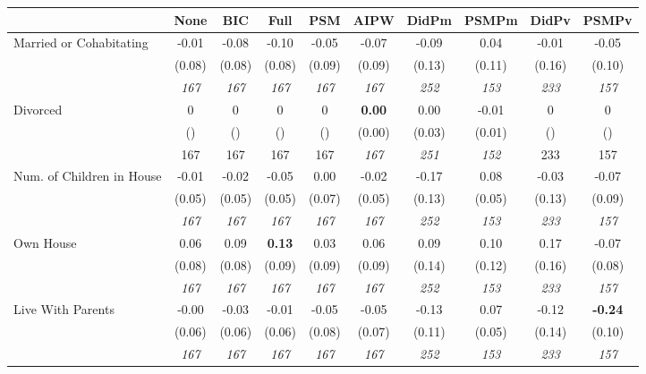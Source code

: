 \begin{tabular}{l c c c c c c c c c}
\toprule
 & None & BIC & Full & PSM & AIPW & DidPm & PSMPm & DidPv & PSMPv \\
\midrule
Married or Cohabitating & -0.01 & -0.08 & -0.10 & -0.05 & -0.07 & -0.09 & 0.04 & -0.01 & -0.05 \\
& (0.08) & (0.08) & (0.08) & (0.09) & (0.09) & (0.13) & (0.11) & (0.16) & (0.10) \\
& \textit{ 167 } & \textit{ 167 } & \textit{ 167 } & \textit{ 167 } & \textit{ 167 } & \textit{ 252 } & \textit{ 153 } & \textit{ 233 } & \textit{ 157 } \\
Divorced & 0 & 0 & 0 & 0 & \textbf{0.00} & 0.00 & -0.01 & 0 & 0 \\
& () & () & () & () & (0.00) & (0.03) & (0.01) & () & () \\
& 167 & 167 & 167 & 167 & \textit{ 167 } & \textit{ 251 } & \textit{ 152 } & 233 & 157 \\
Num. of Children in House & -0.01 & -0.02 & -0.05 & 0.00 & -0.02 & -0.17 & 0.08 & -0.03 & -0.07 \\
& (0.05) & (0.05) & (0.05) & (0.07) & (0.05) & (0.13) & (0.05) & (0.13) & (0.09) \\
& \textit{ 167 } & \textit{ 167 } & \textit{ 167 } & \textit{ 167 } & \textit{ 167 } & \textit{ 252 } & \textit{ 153 } & \textit{ 233 } & \textit{ 157 } \\
Own House & 0.06 & 0.09 & \textbf{ 0.13 } & 0.03 & 0.06 & 0.09 & 0.10 & 0.17 & -0.07 \\
& (0.08) & (0.08) & (0.09) & (0.09) & (0.09) & (0.14) & (0.12) & (0.16) & (0.08) \\
& \textit{ 167 } & \textit{ 167 } & \textit{ 167 } & \textit{ 167 } & \textit{ 167 } & \textit{ 252 } & \textit{ 153 } & \textit{ 233 } & \textit{ 157 } \\
Live With Parents & -0.00 & -0.03 & -0.01 & -0.05 & -0.05 & -0.13 & 0.07 & -0.12 & \textbf{-0.24} \\
& (0.06) & (0.06) & (0.06) & (0.08) & (0.07) & (0.11) & (0.05) & (0.14) & (0.10) \\
& \textit{ 167 } & \textit{ 167 } & \textit{ 167 } & \textit{ 167 } & \textit{ 167 } & \textit{ 252 } & \textit{ 153 } & \textit{ 233 } & \textit{ 157 } \\
\bottomrule
\end{tabular}
